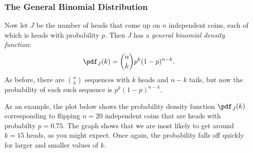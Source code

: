 \subsubsection{The General Binomial Distribution}

Now let $J$ be the number of heads that come up on $n$ independent
coins, each of which is heads with probability $p$.  Then $J$ has a
\textit{general binomial density function}:
%
\[
\pdf_J(k) = \binom{n}{k} p^k (1-p)^{n-k}.
\]
%
As before, there are $\binom{n}{k}$ sequences with $k$ heads and $n -
k$ tails, but now the probability of each such sequence is $p^k
(1-p)^{n-k}$.

As an example, the plot below shows the probability density function
$\pdf_J(k)$ corresponding to flipping $n=20$ independent coins that
are heads with probabilty $p = 0.75$.  The graph shows that we are
most likely to get around $k = 15$ heads, as you might expect.  Once
again, the probability falls off quickly for larger and smaller values
of $k$.
%
